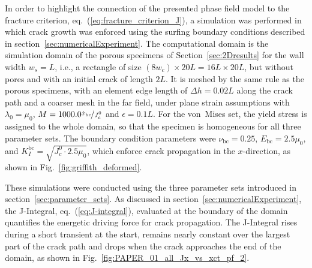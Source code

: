\documentclass[pdflatex,sn-mathphys-num]{sn-jnl}%
\theoremstyle{thmstyleone}%
\theoremstyle{thmstyletwo}%
\theoremstyle{thmstylethree}%
\begin{document}
In order to highlight the connection of the presented phase field model to the fracture criterion, eq.~(\ref{eq:fracture_criterion_J}), a simulation was performed in which crack growth was enforced using the surfing boundary conditions described in section~\ref{sec:numericalExperiment}. The computational domain is the simulation domain of the porous specimens of Section~\ref{sec:2Dresults} for the wall width $w_s = L$, i.e., a rectangle of size $(8w_c) \times 20L = 16L \times 20L$, but without pores and with an initial crack of length $2L$. It is meshed by the same rule as the porous specimens, with an element edge length of $\Delta h = 0.02L$ along the crack path and a coarser mesh in the far field, under plane strain assumptions with $\lambda_0 = \mu_0$, $M = 1000.0 \nicefrac{\dot{x}_{\text{bc}}}{J_c^0}$ and $\epsilon = 0.1L$. For the von~Mises set, the yield stress is assigned to the whole domain, so that the specimen is homogeneous for all three parameter sets. The boundary condition parameters were $\nu_{\text{bc}} = 0.25$, $E_{\text{bc}} = 2.5\mu_{0}$, and $K_I^{\text{bc}} = \sqrt{J_c^0 \cdot 2.5\mu_{0}}$, which enforce crack propagation in the $x$-direction, as shown in Fig.~\ref{fig:griffith_deformed}.

These simulations were conducted using the three parameter sets introduced in section~\ref{sec:parameter_sets}. 
As discussed in section~\ref{sec:numericalExperiment}, the J-Integral, eq.~(\ref{eq:J-integral}), evaluated at the boundary of the domain quantifies the energetic driving force for crack propagation. 
The J-Integral rises during a short transient at the start, remains nearly constant over the largest part of the crack path and drops when the crack approaches the end of the domain, as shown in Fig.~\ref{fig:PAPER_01_all_Jx_vs_xct_pf_2}.
\end{document}
